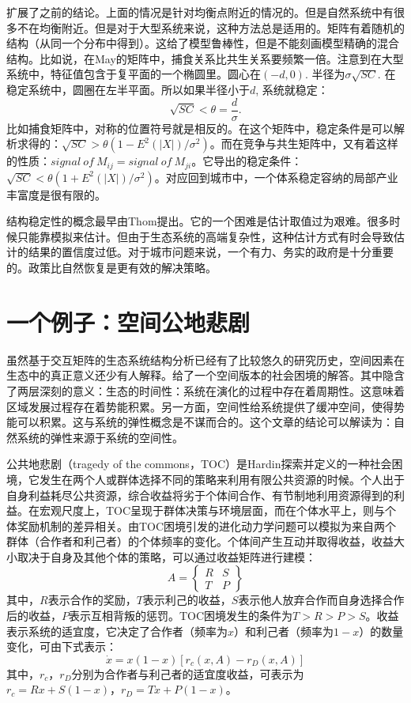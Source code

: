 \cite{Allesina2012}扩展了之前的结论。上面的情况是针对均衡点附近的情况的。但是自然系统中有很多不在均衡附近。但是对于大型系统来说，这种方法总是适用的。矩阵有着随机的结构（从同一个分布中得到）。这给了模型鲁棒性，但是不能刻画模型精确的混合结构。比如说，在May的矩阵中，捕食关系比共生关系要频繁一倍。注意到在大型系统中，特征值包含于复平面的一个椭圆里。圆心在$(-d,0).$ 半径为$\sigma\sqrt{SC}.$ 在稳定系统中，圆圈在左半平面。所以如果半径小于$d$, 系统就稳定：\[\sqrt{SC}<\theta =\frac{d}{\sigma}.\]比如捕食矩阵中，对称的位置符号就是相反的。在这个矩阵中，稳定条件是可以解析求得的：$\sqrt{SC}>\theta(1-E^2(|X|)/\sigma^2)$。而在竞争与共生矩阵中，又有着这样的性质：$signal\ of\ M_{ij}=signal\ of\ M_{ji}$。它导出的稳定条件：$\sqrt{SC}<\theta(1+E^2(|X|)/\sigma^2)$。对应回到城市中，一个体系稳定容纳的局部产业丰富度是很有限的。

结构稳定性的概念最早由Thom\cite{thom2018structural}提出。它的一个困难是估计取值过为艰难。很多时候只能靠模拟来估计。但由于生态系统的高端复杂性，这种估计方式有时会导致估计的结果的置信度过低。对于城市问题来说，一个有力、务实的政府是十分重要的。政策比自然恢复是更有效的解决策略。


\section{一个例子：空间公地悲剧}

虽然基于交互矩阵的生态系统结构分析已经有了比较悠久的研究历史，空间因素在生态中的真正意义还少有人解释。\cite{PhysRevLett.122.148102}给了一个空间版本的社会困境的解答。其中隐含了两层深刻的意义：生态的时间性：系统在演化的过程中存在着周期性。这意味着区域发展过程存在着势能积累。另一方面，空间性给系统提供了缓冲空间，使得势能可以积累。这与系统的弹性\cite{gao2016universal}概念是不谋而合的。这个文章的结论可以解读为：自然系统的弹性来源于系统的空间性。

公共地悲剧（tragedy of the commons，TOC）是Hardin\cite{hardin1968tragedy}探索并定义的一种社会困境，它发生在两个人或群体选择不同的策略来利用有限公共资源的时候。个人出于自身利益耗尽公共资源，综合收益将劣于个体间合作、有节制地利用资源得到的利益。在宏观尺度上，TOC呈现于群体决策与环境层面，而在个体水平上，则与个体奖励机制的差异相关。由TOC困境引发的进化动力学问题可以模拟为来自两个群体（合作者和利己者）的个体频率的变化。个体间产生互动并取得收益，收益大小取决于自身及其他个体的策略，可以通过收益矩阵进行建模：
\[A = \begin{Bmatrix}
R &S \\T &P
\end{Bmatrix}\]
其中，$R$表示合作的奖励，$T$表示利己的收益，$S$表示他人放弃合作而自身选择合作后的收益，$P$表示互相背叛的惩罚。TOC困境发生的条件为$T>R>P>S$。收益表示系统的适宜度，它决定了合作者（频率为$x$）和利己者（频率为$1-x$）的数量变化，可由下式表示：
\begin{equation}
\dot{x} = x(1-x)[r_c(x,A)-r_D(x,A)]
\end{equation}
其中，$r_c$，$r_D$分别为合作者与利己者的适宜度收益，可表示为$r_c=Rx+S(1-x)$，$r_D=Tx+P(1-x)$。


